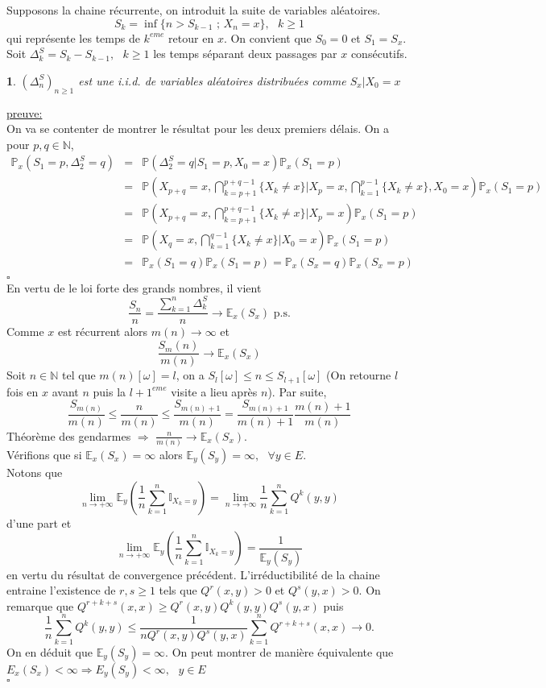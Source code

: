 \documentclass[8pt,notheorems]{beamer}
\def \E{\mathbb E}
\def \N{\mathbb N}
\def \P {\mathbb P}
\renewcommand{\Pr}{\mathbb{P}}
\newtheorem{lemma}{\translate{Lemme}}
\theoremstyle{definition}
\theoremstyle{example}
\theoremstyle{mystyle}
\theoremstyle{plain}
\begin{document}
\begin{frame}[allowframebreaks]
Supposons la chaine récurrente, on introduit la suite de variables aléatoires.
$$S_k=\inf\{n>S_{k-1}\text{ ; }X_n=x\},\text{ }k\geq1$$
qui représente les temps de $k^{eme}$ retour en $x$. On convient que $S_0=0$ et $S_1=S_x$. Soit $\Delta^{S}_k=S_k-S_{k-1},\text{ }k\geq1$ les temps séparant deux passages par $x$ consécutifs.
\begin{lemma}
$(\Delta^S_n)_{n\geq1}$ est une i.i.d. de variables aléatoires distribuées comme $S_x|X_0=x$
\end{lemma}
\underline{preuve:}\\
On va se contenter de montrer le résultat pour les deux premiers délais. On a pour $p,q\in\N$,
\begin{eqnarray*}
\Pr_x(S_1=p,\Delta^S_2=q)&=&\Pr(\Delta^S_2=q|S_1=p,X_0=x)\Pr_x(S_1=p)\\
&=&\Pr(X_{p+q}=x,\bigcap_{k=p+1}^{p+q-1}\{X_k\neq x\}|X_{p}=x,\bigcap_{k=1}^{p-1}\{X_k\neq x\},X_0=x)\P_x(S_1=p)\\
&=&\Pr(X_{p+q}=x,\bigcap_{k=p+1}^{p+q-1}\{X_k\neq x\}|X_{p}=x)\Pr_x(S_1=p)\\
&=&\Pr(X_{q}=x,\bigcap_{k=1}^{q-1}\{X_k\neq x\}|X_{0}=x)\Pr_x(S_1=p)\\
&=&\Pr_x(S_1=q)\Pr_x(S_1=p)=\Pr_x(S_x=q)\Pr_x(S_x=p)\\
\end{eqnarray*}
 $\square$\\
En vertu de le loi forte des grands nombres, il vient
$$
\frac{S_n}{n}=\frac{\sum_{k=1}^{n}\Delta^{S}_{k}}{n}\rightarrow \E_x(S_x)\text{ p.s.}
$$
Comme $x$ est récurrent alors $m(n)\rightarrow\infty$ et
$$
\frac{S_m(n)}{m(n)}\rightarrow\E_x(S_x)
$$
Soit $n\in\N$ tel que $m(n)[\omega]=l$, on a $S_l[\omega]\leq n\leq S_{l+1}[\omega]$ (On retourne $l$ fois en $x$ avant $n$ puis la $l+1^{eme}$ visite a lieu après $n$). Par suite,
$$
\frac{S_{m(n)}}{m(n)}\leq\frac{n}{m(n)}\leq \frac{S_{m(n)+1}}{m(n)}=\frac{S_{m(n)+1}}{m(n)+1}\frac{m(n)+1}{m(n)}
$$
Théorème des gendarmes $\Rightarrow$ $\frac{n}{m(n)}\rightarrow\mathbb{E}_x(S_x)$.\\
Vérifions que si $\mathbb{E}_x(S_x)=\infty$ alors $\mathbb{E}_y(S_y)=\infty,\text{ }\forall y\in E$.\\
Notons que
$$
\underset{n\rightarrow+\infty}{\lim} \E_{y}\left(\frac{1}{n}\sum_{k=1}^{n}\mathbb{I}_{X_{k}=y}\right)=\underset{n\rightarrow+\infty}{\lim} \frac{1}{n}\sum_{k=1}^{n}Q^{k}(y,y)
$$
d'une part et
$$
\underset{n\rightarrow+\infty}{\lim} \E_{y}\left(\frac{1}{n}\sum_{k=1}^{n}\mathbb{I}_{X_{k}=y}\right)=\frac{1}{\E_y(S_y)}
$$
en vertu du résultat de convergence précédent. L'irréductibilité de la chaine entraine l'existence de $r,s \geq 1$ tels que $Q^{r}(x,y)>0$ et $Q^{s}(y,x)>0$. On remarque que $Q^{r+k+s}(x,x)\geq Q^{r}(x,y)Q^{k}(y,y)Q^{s}(y,x)$ puis
$$
\frac{1}{n}\sum_{k=1}^{n}Q^{k}(y,y)\leq \frac{1}{nQ^{r}(x,y)Q^{s}(y,x)}\sum_{k=1}^{n}Q^{r+k+s}(x,x)\rightarrow 0.
$$
On en déduit que $\E_y(S_y)=\infty$. On peut montrer de manière équivalente que $E_x(S_x)<\infty\Rightarrow E_y(S_y)<\infty,\text{ }y\in E$\\
$\square$
\end{frame}
\end{document}
